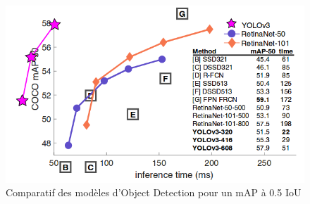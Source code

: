 \begin{figure}
\centering
\includegraphics[scale=0.4]{./tex/computer-vision/sota/comp4.png}
\caption{Comparatif des modèles d'Object Detection pour un mAP à 0.5 IoU}
\label{compobj2}
\end{figure}
